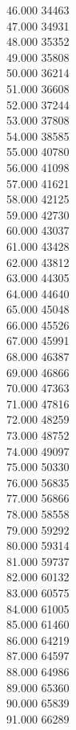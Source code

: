 { 46.000	34463 \\
 47.000	34931 \\
 48.000	35352 \\
 49.000	35808 \\
 50.000	36214 \\
 51.000	36608 \\
 52.000	37244 \\
 53.000	37808 \\
 54.000	38585 \\
 55.000	40780 \\
 56.000	41098 \\
 57.000	41621 \\
 58.000	42125 \\
 59.000	42730 \\
 60.000	43037 \\
 61.000	43428 \\
 62.000	43812 \\
 63.000	44305 \\
 64.000	44640 \\
 65.000	45048 \\
 66.000	45526 \\
 67.000	45991 \\
 68.000	46387 \\
 69.000	46866 \\
 70.000	47363 \\
 71.000	47816 \\
 72.000	48259 \\
 73.000	48752 \\
 74.000	49097 \\
 75.000	50330 \\
 76.000	56835 \\
 77.000	56866 \\
 78.000	58558 \\
 79.000	59292 \\
 80.000	59314 \\
 81.000	59737 \\
 82.000	60132 \\
 83.000	60575 \\
 84.000	61005 \\
 85.000	61460 \\
 86.000	64219 \\
 87.000	64597 \\
 88.000	64986 \\
 89.000	65360 \\
 90.000	65839 \\
 91.000	66289 \\
}
